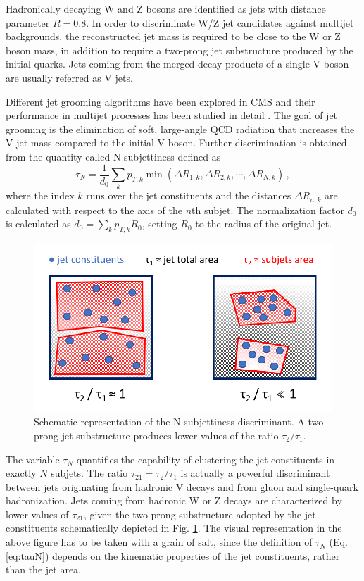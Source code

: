 Hadronically decaying W and Z bosons are identified as jets with distance parameter $R=0.8$. In order to discriminate W/Z jet candidates against multijet backgrounds, the reconstructed jet mass is required to be close to the W or Z boson mass, in addition to require a two-prong jet substructure produced by the initial quarks. Jets coming from the merged decay products of a single V boson are usually referred as V jets. 

Different jet grooming algorithms have been explored in CMS and their performance in multijet processes has been studied in detail \cite{Chatrchyan:2013vbb}. The goal of jet grooming is the elimination of soft, large-angle QCD radiation that increases the V jet mass compared to the initial V boson. Further discrimination is obtained from the quantity called N-subjettiness \cite{Thaler:2011gf} defined as
\begin{equation}
	\label{eq:tauN}
	\tau_N = \frac{1}{d_0} \sum_k{p_{T,k} \min(\Delta R_{1,k}, \Delta R_{2,k}, \cdots, \Delta R_{N,k})}\,, 
\end{equation}
where the index $k$ runs over the jet constituents and the distances $\Delta R_{n,k}$ are calculated with respect to the axis of the $n$th subjet. The normalization factor $d_0$ is calculated as $d_0 = \sum_k{p_{T,k}R_0}$, setting $R_0$ to the radius of the original jet. 

\begin{figure}[h]
\centering
\includegraphics[scale=0.35]{figures/experiment/visualTau21.png} 
\caption[Intuition of Tau21]{Schematic representation of the N-subjettiness discriminant. A two-prong jet substructure produces lower values of the ratio $\tau_2/\tau_1$.}
\label{visualtau21}
\end{figure}

The variable $\tau_N$ quantifies the capability of clustering the jet constituents in exactly $N$ subjets. The ratio $\tau_{21} = \tau_2 / \tau_1$ is actually a powerful discriminant between jets originating from hadronic V decays and from gluon and single-quark hadronization. Jets coming from hadronic W or Z decays are characterized by lower values of $\tau_{21}$, given the two-prong substructure adopted by the jet constituents schematically depicted in Fig. \ref{visualtau21}. The visual representation in the above figure has to be taken with a grain of salt, since the definition of $\tau_N$ (Eq. \ref{eq:tauN}) depends on the kinematic properties of the jet constituents, rather than the jet area.


